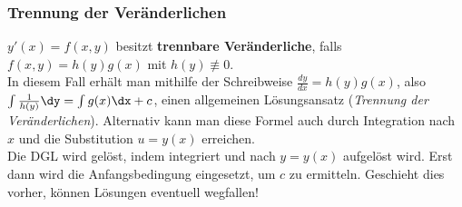 \subsubsection{%
    Trennung der Veränderlichen%
}

$y'(x) = f(x, y)$ besitzt \textbf{trennbare Veränderliche}, falls
$f(x, y) = h(y) g(x)$ mit $h(y) \not\equiv 0$. \\
In diesem Fall erhält man mithilfe der Schreibweise
$\frac{dy}{dx} = h(y)g(x)$, also $\int \frac{1}{h(y)}\dy = \int g(x)\dx + c$,
einen allgemeinen Lösungsansatz (\emph{Trennung der Veränderlichen}).
Alternativ kann man diese Formel auch durch Integration nach $x$ und
die Substitution $u = y(x)$ erreichen. \\
Die DGL wird gelöst, indem integriert und nach $y = y(x)$ aufgelöst wird.
Erst dann wird die Anfangsbedingung eingesetzt, um $c$ zu ermitteln.
Geschieht dies vorher, können Lösungen eventuell wegfallen!

